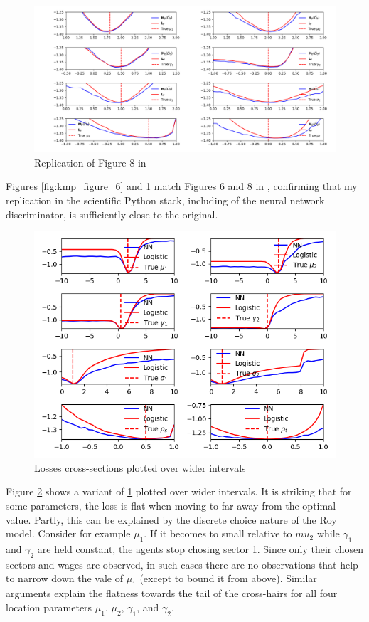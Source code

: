 \begin{figure}
    \includegraphics[width=\textwidth]{./Images/kmp_figure_8_sp.png}
    \caption{Replication of Figure 8 in \cite{kaji2023adversarial}}
    \label{fig:kmp_figure_8_sp}
\end{figure}

Figures \ref{fig:kmp_figure_6} and \ref{fig:kmp_figure_8_sp} match Figures 6 and 8 in \cite{kaji2023adversarial}, confirming that my replication in the scientific Python stack, including of the neural network discriminator, is sufficiently close to the original.  

\begin{figure}
    \includegraphics[width=\textwidth]{./Images/wide_loss_plots.png} %
    \caption{Losses cross-sections plotted over wider intervals}
    \label{fig:wide_loss_plots}
\end{figure}

Figure \ref{fig:wide_loss_plots} shows a variant of \ref{fig:kmp_figure_8_sp} plotted over wider intervals.
It is striking that for some parameters, the loss is flat when moving to far away from the optimal value.
Partly, this can be explained by the discrete choice nature of the Roy model.
Consider for example $\mu_1$.
If it becomes to small relative to $mu_2$ while $\gamma_1$ and $\gamma_2$ are held constant, the agents stop chosing sector 1.
Since only their chosen sectors and wages are observed, in such cases there are no observations that help to narrow down the vale of $\mu_1$ (except to bound it from above).
Similar arguments explain the flatness towards the tail of the cross-hairs for all four location parameters $\mu_1$, $\mu_2$, $\gamma_1$, and $\gamma_2$. %

